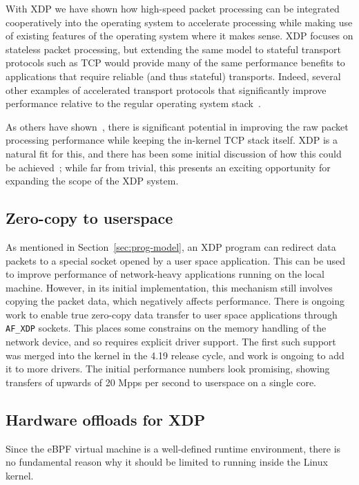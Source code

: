 \documentclass[sigconf]{acmart}
\begin{document}
With XDP we have shown how high-speed packet processing can be integrated
cooperatively into the operating system to accelerate processing while making
use of existing features of the operating system where it makes sense. XDP
focuses on stateless packet processing, but extending the same model to stateful
transport protocols such as TCP would provide many of the same performance
benefits to applications that require reliable (and thus stateful) transports.
Indeed, several other examples of accelerated transport protocols that
significantly improve performance relative to the regular operating system
stack~\cite{stackmap,sandstorm,belay2014ix,jeong2014mtcp}.

As others have shown~\cite{stackmap}, there is significant potential in
improving the raw packet processing performance while keeping the in-kernel TCP
stack itself. XDP is a natural fit for this, and there has been some initial
discussion of how this could be achieved~\cite{txdp}; while far from trivial,
this presents an exciting opportunity for expanding the scope of the XDP system.

\subsection{Zero-copy to userspace}
\label{sec:zero-copy-userspace}

As mentioned in Section~\ref{sec:prog-model}, an XDP program can redirect data
packets to a special socket opened by a user space application. This can be used
to improve performance of network-heavy applications running on the local
machine. However, in its initial implementation, this mechanism still involves
copying the packet data, which negatively affects performance. There is ongoing
work to enable true zero-copy data transfer to user space applications through
\texttt{AF\_XDP} sockets. This places some constrains on the memory handling of
the network device, and so requires explicit driver support. The first such
support was merged into the kernel in the 4.19 release cycle, and work is
ongoing to add it to more drivers. The initial performance numbers look
promising, showing transfers of upwards of 20 Mpps per second to userspace on a
single core.

\subsection{Hardware offloads for XDP}
\label{sec:hardw-offl-xdp}

Since the eBPF virtual machine is a well-defined runtime environment, there is
no fundamental reason why it should be limited to running inside the Linux
kernel.
\end{document}
